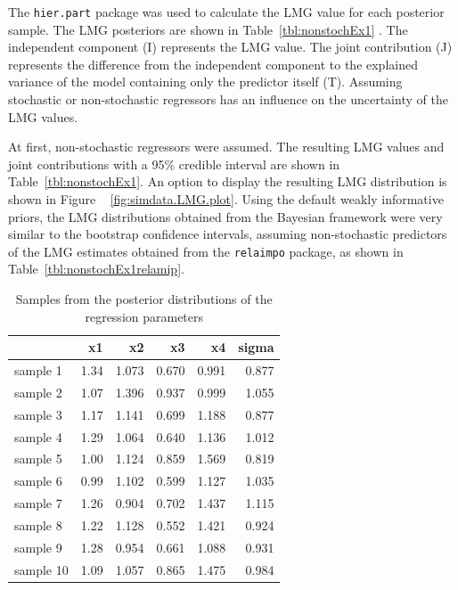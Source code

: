 \documentclass[11pt,a4paper,twoside]{book}
\newenvironment{knitrout}{}{} %
\begin{document}
The \texttt{hier.part} package was used to calculate the LMG value for each posterior sample. The LMG posteriors are shown in Table~\ref{tbl:nonstochEx1} . The independent component (I) represents the LMG value. The joint contribution (J) represents the difference from the independent component to the explained variance of the model containing only the predictor itself (T). Assuming stochastic or non-stochastic regressors has an influence on the uncertainty of the LMG values. 

At first, non-stochastic regressors were assumed. The resulting LMG values and joint contributions with a 95\% credible interval are shown in Table~\ref{tbl:nonstochEx1}. An option to display the resulting LMG distribution is shown in Figure ~ \ref{fig:simdata.LMG.plot}.  Using the default weakly informative priors, the LMG distributions obtained from the Bayesian framework were very similar to the bootstrap confidence intervals, assuming non-stochastic predictors of the LMG estimates obtained from the \texttt{relaimpo} package, as shown in Table~\ref{tbl:nonstochEx1relamip}. 





\begin{knitrout}
\color{fgcolor}\begin{table}

\caption{\label{tab:simdata.postsample2}Samples from the posterior distributions of the regression parameters}
\centering
\begin{tabular}[t]{lrrrrr}
\toprule
  & x1 & x2 & x3 & x4 & sigma\\
\midrule
sample 1 & 1.34 & 1.073 & 0.670 & 0.991 & 0.877\\
sample 2 & 1.07 & 1.396 & 0.937 & 0.999 & 1.055\\
sample 3 & 1.17 & 1.141 & 0.699 & 1.188 & 0.877\\
sample 4 & 1.29 & 1.064 & 0.640 & 1.136 & 1.012\\
sample 5 & 1.00 & 1.124 & 0.859 & 1.569 & 0.819\\
sample 6 & 0.99 & 1.102 & 0.599 & 1.127 & 1.035\\
sample 7 & 1.26 & 0.904 & 0.702 & 1.437 & 1.115\\
sample 8 & 1.22 & 1.128 & 0.552 & 1.421 & 0.924\\
sample 9 & 1.28 & 0.954 & 0.661 & 1.088 & 0.931\\
sample 10 & 1.09 & 1.057 & 0.865 & 1.475 & 0.984\\
\bottomrule
\end{tabular}
\end{table}


\end{knitrout}
\end{document}
